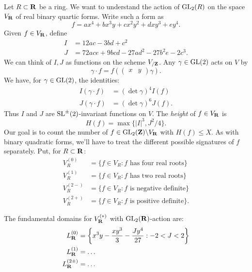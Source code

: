 Let $R\subset \mathbf{R}$ be a ring. We want to understand the action of $\operatorname{GL}_2(R)$ on 
the space $V_{\mathbf{R}}$ of real binary quartic forms. Write such a form as 
\[
  f = a x^4 + b x^3 y + c x^2 y^2 + d x y^3 + e y^4 .
\]
Given $f\in V_{\mathbf{R}}$, define 
\begin{align*}
  I &= 12 a c-3 b d+c^2 \\
  J &= 72 a c e+ 9 b c d-27 a d^2-27b^2 e- 2c^3 .
\end{align*}
We can think of $I,J$ as functions on the scheme $V_{/\mathbf{Z}}$. Any 
$\gamma\in \operatorname{GL}(2)$ acts on $V$ by 
\[
  \gamma\cdot f = f\left(\begin{pmatrix} x & y \end{pmatrix} \gamma \right) .
\]
We have, for $\gamma\in \operatorname{GL}(2)$, the identities:  
\begin{align*}
  I(\gamma\cdot f) &= (\det\gamma)^4 I(f) \\
  J(\gamma\cdot f) &= (\det\gamma)^6 J(f) .
\end{align*}
Thus $I$ and $J$ are $\operatorname{SL}^\pm(2)$-invariant functions on $V$. The \emph{height} 
of $f\in V_{\mathbf{R}}$ is 
\[
  H(f) = \max\{|I|^3,J^2/4\} .
\]
Our goal is to count the number of $f\in \operatorname{GL}_2(\mathbf{Z})\backslash V_{\mathbf{R}}$ with 
$H(f)\leqslant X$. As with binary quadratic forms, we'll have to treat the 
different possible signatures of $f$ separately. Put, for $R\subset \mathbf{R}$:
\begin{align*}
  V_R^{(0)} &= \{f\in V_R:f\text{ has four real roots}\} \\
  V_R^{(1)} &= \{f\in V_R:f\text{ has two real roots}\} \\
  V_R^{(2-)} &= \{f\in V_R:f\text{ is negative definite}\} \\
  V_R^{(2+)} &= \{f\in V_R:f\text{ is positive definite}\} .
\end{align*}

\begin{proposition}
The fundamental domains for $V_{\mathbf{R}}^{(\ast)}$ with $\operatorname{GL}_2(\mathbf{R})$-action are: 
\begin{align*}
  L_{\mathbf{R}}^{(0)} &= \left\{x^3 y-\frac{x y^3}{3} - \frac{J y^4}{27}:-2<J<2\right\} \\
  L_{\mathbf{R}}^{(1)} &= \ldots \\ 
  L_{\mathbf{R}}^{(2\pm )} &= \ldots 
\end{align*}
\end{proposition}

